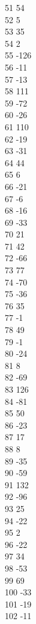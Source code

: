 { 51	54 \\
 52	5 \\
 53	35 \\
 54	2 \\
 55	-126 \\
 56	-11 \\
 57	-13 \\
 58	111 \\
 59	-72 \\
 60	-26 \\
 61	110 \\
 62	-19 \\
 63	-31 \\
 64	44 \\
 65	6 \\
 66	-21 \\
 67	-6 \\
 68	-16 \\
 69	-33 \\
 70	21 \\
 71	42 \\
 72	-66 \\
 73	77 \\
 74	-70 \\
 75	-36 \\
 76	35 \\
 77	-1 \\
 78	49 \\
 79	-1 \\
 80	-24 \\
 81	8 \\
 82	-69 \\
 83	126 \\
 84	-81 \\
 85	50 \\
 86	-23 \\
 87	17 \\
 88	8 \\
 89	-35 \\
 90	-59 \\
 91	132 \\
 92	-96 \\
 93	25 \\
 94	-22 \\
 95	2 \\
 96	-22 \\
 97	34 \\
 98	-53 \\
 99	69 \\
 100	-33 \\
 101	-19 \\
 102	-11 \\
}

